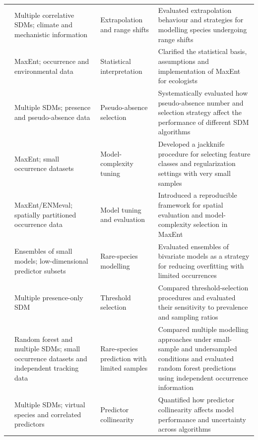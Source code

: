 \documentclass[authoryear,preprint,review,12pt]{elsarticle}
\begin{document}
\begin{xltabular}{\textwidth}{
@{}
Y{0.70}
Y{1.10}
Y{0.80}
Y{1.40}
@{}
}
\citep{elith2010art} &
Multiple correlative SDMs; climate and mechanistic information &
Extrapolation and range shifts &
Evaluated extrapolation behaviour and strategies for modelling species undergoing range shifts \\

\citep{elith2011statistical} &
MaxEnt; occurrence and environmental data &
Statistical interpretation &
Clarified the statistical basis, assumptions and implementation of MaxEnt for ecologists \\

\citep{barbet2012selecting} &
Multiple SDMs; presence and pseudo-absence data &
Pseudo-absence selection &
Systematically evaluated how pseudo-absence number and selection strategy affect the performance of different SDM algorithms \\

\citep{shcheglovitova2013estimating} &
MaxEnt; small occurrence datasets &
Model-complexity tuning &
Developed a jackknife procedure for selecting feature classes and regularization settings with very small samples \\

\citep{muscarella2014enm} &
MaxEnt/ENMeval; spatially partitioned occurrence data &
Model tuning and evaluation &
Introduced a reproducible framework for spatial evaluation and model-complexity selection in MaxEnt \\

\citep{breiner2015overcoming} &
Ensembles of small models; low-dimensional predictor subsets &
Rare-species modelling &
Evaluated ensembles of bivariate models as a strategy for reducing overfitting with limited occurrences \\

\citep{liu2016selection} &
Multiple presence-only SDM &
Threshold selection &
Compared threshold-selection procedures and evaluated their sensitivity to prevalence and sampling ratios \\

\citep{mi2017choose} &
Random forest and multiple SDMs; small occurrence datasets and independent tracking data &
Rare-species prediction with limited samples &
Compared multiple modelling approaches under small-sample and undersampled conditions and evaluated random forest predictions using independent occurrence information \\

\citep{de2018evaluating} &
Multiple SDMs; virtual species and correlated predictors &
Predictor collinearity &
Quantified how predictor collinearity affects model performance and uncertainty across algorithms \\


\end{xltabular}
\end{document}
